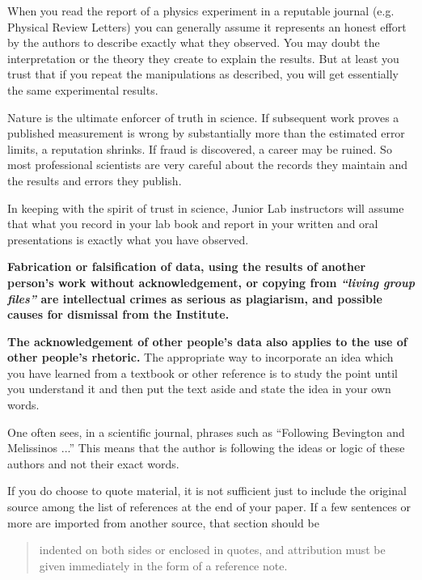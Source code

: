 When you read the report of a physics experiment in a reputable
journal (e.g. Physical Review Letters) you can generally assume it
represents an honest effort by the authors to describe exactly what
they observed. You may doubt the interpretation or the theory they
create to explain the results. But at least you trust that if you
repeat the manipulations as described, you will get essentially the
same experimental results.

Nature is the ultimate enforcer of truth in science. If subsequent
work proves a published measurement is wrong by substantially more
than the estimated error limits, a reputation shrinks. If fraud is
discovered, a career may be ruined. So most professional scientists
are very careful about the records they maintain and the results and
errors they publish.

In keeping with the spirit of trust in science, Junior Lab instructors
will assume that what you record in your lab book and report in your
written and oral presentations is exactly what you have observed.

{\bf Fabrication or falsification of data, using the results of
another person's work without acknowledgement, or copying from {\em
``living group files''} are intellectual crimes as serious as
plagiarism, and possible causes for dismissal from the Institute.}

{\bf The acknowledgement of other people's data also applies to the use
of other people's rhetoric.} The appropriate way to incorporate an
idea which you have learned from a textbook or other reference is to
study the point until you understand it and then put the text aside
and state the idea in your own words.

One often sees, in a scientific journal, phrases such as ``Following
Bevington and Melissinos \cite{bevington2003, melissinos1966} ...''
This means that the author is following the ideas or logic of these
authors and not their exact words.

If you do choose to quote material, it is not sufficient just to
include the original source among the list of references at the end of
your paper. If a few sentences or more are imported from another
source, that section should be

\begin{quote}indented on both sides or enclosed in
quotes, and attribution must be given immediately in the form of a
reference note.\cite{melissinos1966}
\end{quote}


